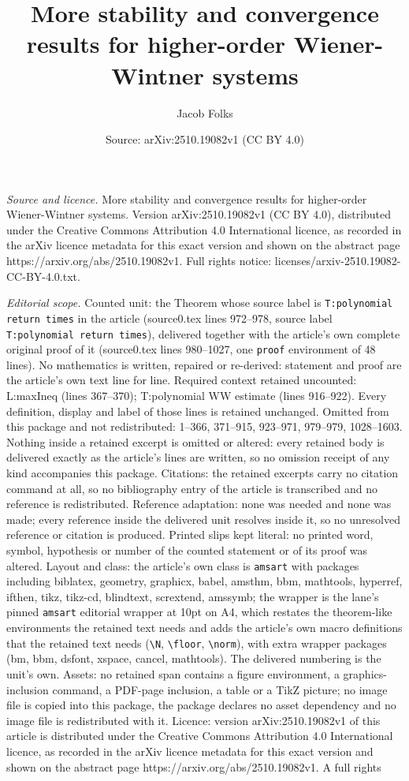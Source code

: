 \documentclass[10pt,a4paper]{amsart}
\title[More stability and convergence results for higher-order Wien]{More stability and convergence results for higher-order Wiener-Wintner systems}
\author{Jacob Folks}
\date{Source: arXiv:2510.19082v1 (CC BY 4.0)}
\begin{document}
\maketitle

\noindent\emph{Source and licence.} More stability and convergence results for higher-order Wiener-Wintner systems. Version arXiv:2510.19082v1 (CC BY 4.0), distributed under the Creative Commons Attribution 4.0 International licence, as recorded in the arXiv licence metadata for this exact version and shown on the abstract page https://arxiv.org/abs/2510.19082v1. Full rights notice: licenses/arxiv-2510.19082-CC-BY-4.0.txt.\par\smallskip

\noindent\textit{Editorial scope.} Counted unit: the Theorem whose source label is \texttt{T:polynomial return times} in the article (source0.tex lines 972--978, source label \texttt{T:polynomial return times}), delivered together with the article's own complete original proof of it (source0.tex lines 980--1027, one \texttt{proof} environment of 48 lines). No mathematics is written, repaired or re-derived: statement and proof are the article's own text line for line. Required context retained uncounted: L:maxIneq (lines 367--370); T:polynomial WW estimate (lines 916--922). Every definition, display and label of those lines is retained unchanged. Omitted from this package and not redistributed: 1--366, 371--915, 923--971, 979--979, 1028--1603. Nothing inside a retained excerpt is omitted or altered: every retained body is delivered exactly as the article's lines are written, so no omission receipt of any kind accompanies this package. Citations: the retained excerpts carry no citation command at all, so no bibliography entry of the article is transcribed and no reference is redistributed. Reference adaptation: none was needed and none was made; every reference inside the delivered unit resolves inside it, so no unresolved reference or citation is produced. Printed slips kept literal: no printed word, symbol, hypothesis or number of the counted statement or of its proof was altered. Layout and class: the article's own class is \texttt{amsart} with packages including biblatex, geometry, graphicx, babel, amsthm, bbm, mathtools, hyperref, ifthen, tikz, tikz-cd, blindtext, scrextend, amssymb; the wrapper is the lane's pinned \texttt{amsart} editorial wrapper at 10pt on A4, which restates the theorem-like environments the retained text needs and adds the article's own macro definitions that the retained text needs (\texttt{\textbackslash N}, \texttt{\textbackslash floor}, \texttt{\textbackslash norm}), with extra wrapper packages (bm, bbm, dsfont, xspace, cancel, mathtools). The delivered numbering is the unit's own. Assets: no retained span contains a figure environment, a graphics-inclusion command, a PDF-page inclusion, a table or a TikZ picture; no image file is copied into this package, the package declares no asset dependency and no image file is redistributed with it. Licence: version arXiv:2510.19082v1 of this article is distributed under the Creative Commons Attribution 4.0 International licence, as recorded in the arXiv licence metadata for this exact version and shown on the abstract page https://arxiv.org/abs/2510.19082v1. A full rights 
\end{document}
